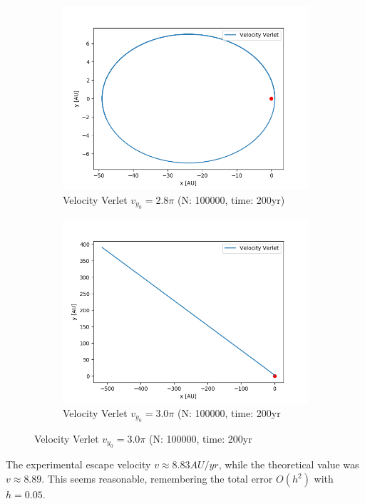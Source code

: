 \documentclass{article}
\begin{document}
\begin{figure}[H]
  \centering
  \begin{subfigure}{0.5\textwidth}
    \centering
    \includegraphics[width=1.0\textwidth]{plots/escape_v2p8pi.png}
    \caption{Velocity Verlet $v_{y_0}=2.8\pi$ (N: 100000, time: 200yr)}
  \end{subfigure}%
  \begin{subfigure}{0.5\textwidth}
    \centering
    \includegraphics[width=1.0\textwidth]{plots/escape_v3p0pi.png}
    \caption{Velocity Verlet $v_{y_0}=3.0\pi$ (N: 100000, time: 200yr}  
  \end{subfigure}
\end{figure}
{\color[rgb]{1,0,0}The experimental escape velocity $v \approx 8.83 AU/yr$, while the theoretical value was $v\approx 8.89$. This seems reasonable, remembering the total error $O(h^2)$ with $h=0.05$.}
\end{document}
